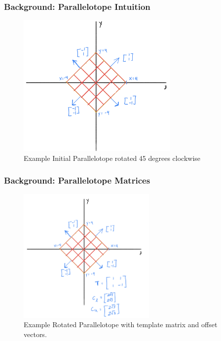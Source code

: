 \documentclass{beamer}
\begin{document}
\begin{frame}
  \frametitle{\textbf{Background:} Parallelotope Intuition}
  \begin{figure}
    \includegraphics[width=0.7\textwidth]{diagptope}
    \caption{Example Initial Parallelotope rotated 45 degrees clockwise}
  \end{figure}
\end{frame}

\begin{frame}
  \frametitle{\textbf{Background:} Parallelotope Matrices}
  \begin{figure}
    \includegraphics[width=0.6\textwidth]{diagptopemat}
    \caption{Example Rotated Parallelotope with template matrix and offset vectors.}
  \end{figure}
\end{frame}
\end{document}
